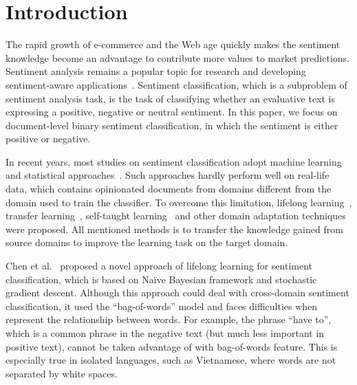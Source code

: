 \section{Introduction}
%
%
%



The rapid growth of e-commerce and the Web age quickly makes the sentiment knowledge become an advantage to contribute more values to market predictions.
Sentiment analysis remains a popular topic for research and developing sentiment-aware applications~\cite{Pang08opinionmining}.
Sentiment classification, which is a subproblem of sentiment analysis task, is the task of classifying whether an evaluative text is expressing a positive, negative or neutral sentiment.
In this paper, we focus on document-level binary sentiment classification, in which the sentiment is either positive or negative.

In recent years, most studies on sentiment classification adopt machine learning and statistical approaches~\cite{Liu12sentimentanalysis}.
Such approaches hardly perform well on real-life data, which contains opinionated documents from domains different from the domain used to train the classifier.
To overcome this limitation, lifelong learning~\cite{chen-ma-liu:2015:ACL-IJCNLP}, transfer learning~\cite{Pan:2010:STL:1850483.1850545}, self-taught learning~\cite{Raina:2007:SLT:1273496.1273592} and other domain adaptation techniques~\cite{Pan:2010:STL:1850483.1850545} were proposed.
All mentioned methods is to transfer the knowledge gained from source domains to improve the learning task on the target domain.

Chen et al.~\cite{chen-ma-liu:2015:ACL-IJCNLP} proposed a novel approach of lifelong learning for sentiment classification, which is based on Naïve Bayesian framework and stochastic gradient descent.
Although this approach could deal with cross-domain sentiment classification, it used the ``bag-of-words'' model and faces difficulties when represent the relationship between words.
For example, the phrase ``have to'', which is a common phrase in the negative text (but much less important in positive text), cannot be taken advantage of with bag-of-words feature.
This is especially true in isolated languages, such as Vietnamese, where words are not separated by white spaces.

